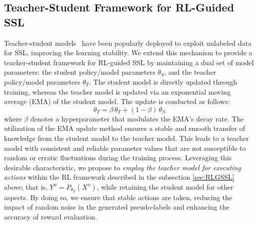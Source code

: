 \subsection{Teacher-Student Framework for RL-Guided SSL}
\label{sec:teacher-student}

Teacher-student models~\cite{tarvainen2017mean} 
have been popularly deployed to exploit unlabeled data for SSL,
improving the learning stability.
We extend this mechanism to provide a teacher-student framework
for RL-guided SSL 
by maintaining a dual set of model parameters: 
the student policy/model parameters $\theta_S$, and the teacher policy/model parameters $\theta_T$. 
The student model is directly updated through training, 
whereas the teacher model is updated via an exponential moving average (EMA) of the student model. 
The update is conducted as follows:
\begin{equation}
\theta_T= \beta\,\theta_T + (1-\beta)\,\theta_S
\label{eq:ema}
\end{equation}
where $\beta$ denotes a hyperparameter that modulates the EMA's decay rate. 
The utilization of the EMA update method ensures a stable and smooth transfer of knowledge from the student model 
to the teacher model. 
This leads to a teacher model with consistent and reliable parameter values 
that are not susceptible to random or erratic fluctuations during the training process.
Leveraging this desirable characteristic, 
we propose to {\em employ the teacher model for executing actions} within the RL framework 
described in the subsection \ref{sec:RLGSSL} above; 
that is, $Y^u=P_{\theta_T}(X^u)$, 
while retaining the student model for other aspects. 
By doing so, we ensure that stable actions are taken, 
reducing the impact of random noise in the generated pseudo-labels and enhancing the accuracy of reward evaluation.


